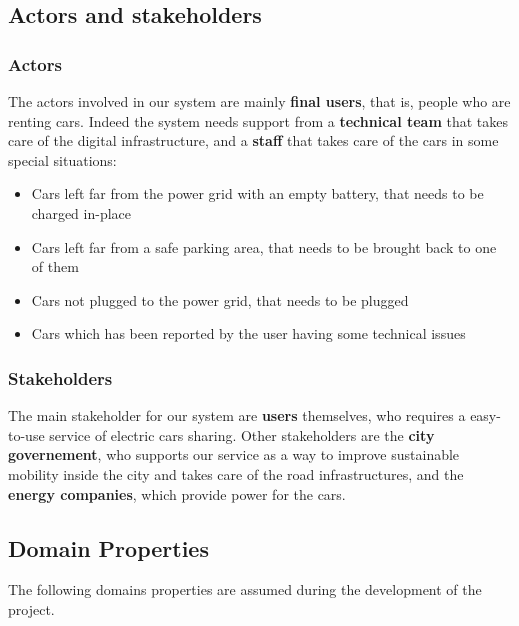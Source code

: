 \documentclass[11pt]{article} %
\begin{document}
\subsection{Actors and stakeholders}

\subsubsection{Actors}
The actors involved in our system are mainly \textbf{final users}, that is, people who are renting cars. Indeed the system needs support from a \textbf{technical team} that takes care of the digital infrastructure, and a \textbf{staff} that takes care of the cars in some special situations:
\begin{itemize} 
	\item Cars left far from the power grid with an empty battery, that needs to be charged in-place
	\item Cars left far from a safe parking area, that needs to be brought back to one of them
	\item Cars not plugged to the power grid, that needs to be plugged
	\item Cars which has been reported by the user having some technical issues
\end{itemize}

\subsubsection{Stakeholders}
The main stakeholder for our system are \textbf{users} themselves, who requires a easy-to-use service of electric cars sharing. Other stakeholders are the \textbf{city governement}, who supports our service as a way to improve sustainable mobility inside the city and takes care of the road infrastructures, and the \textbf{energy companies}, which provide power for the cars.

\subsection{Domain Properties}

The following domains properties are assumed during the development of the project.
\end{document}
